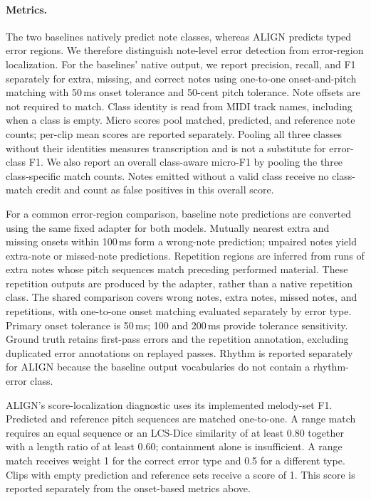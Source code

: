 \paragraph{Metrics.}
The two baselines natively predict note classes, whereas ALIGN predicts
typed error regions. We therefore distinguish note-level error detection
from error-region localization. For the baselines' native output, we
report precision, recall, and F1 separately for extra, missing, and correct
notes using one-to-one onset-and-pitch matching with 50\,ms onset tolerance
and 50-cent pitch tolerance. Note offsets are not required to match.
Class identity is read from MIDI track names, including when a class is
empty. Micro scores pool matched, predicted, and reference note counts;
per-clip mean scores are reported separately. Pooling all three classes
without their identities measures transcription and is not a substitute
for error-class F1.
We also report an overall class-aware micro-F1 by pooling the three
class-specific match counts. Notes emitted without a valid class receive
no class-match credit and count as false positives in this overall score.

For a common error-region comparison, baseline note predictions are
converted using the same fixed adapter for both models. Mutually nearest
extra and missing onsets within 100\,ms form a wrong-note prediction;
unpaired notes yield extra-note or missed-note predictions. Repetition
regions are inferred from runs of extra notes whose pitch sequences match
preceding performed material. These repetition outputs are produced by
the adapter, rather than a native repetition class. The shared comparison
covers wrong notes, extra notes, missed notes, and repetitions, with
one-to-one onset matching evaluated separately by error type. Primary
onset tolerance is 50\,ms; 100 and 200\,ms provide tolerance sensitivity.
Ground truth retains first-pass errors and the repetition annotation,
excluding duplicated error annotations on replayed passes. Rhythm is
reported separately for ALIGN because the baseline output vocabularies
do not contain a rhythm-error class.

ALIGN's score-localization diagnostic uses its implemented melody-set F1.
Predicted and reference pitch sequences are matched one-to-one. A range
match requires an equal sequence or an LCS-Dice similarity of at least
0.80 together with a length ratio of at least 0.60; containment alone is
insufficient. A range match receives weight 1 for the correct error type
and 0.5 for a different type. Clips with empty prediction and reference
sets receive a score of 1. This score is reported separately from the
onset-based metrics above.

